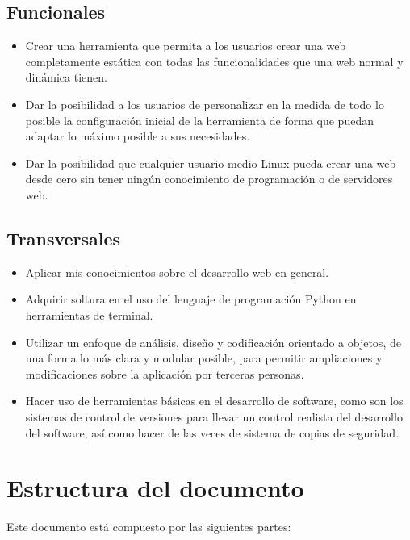 \subsection{Funcionales}
\begin{itemize}
\item Crear una herramienta que permita a los usuarios crear una web completamente estática
con todas las funcionalidades que una web normal y dinámica tienen.
\item Dar la posibilidad a los usuarios de personalizar en la medida de todo lo posible la configuración
inicial de la herramienta de forma que puedan adaptar lo máximo posible a sus necesidades.
\item Dar la posibilidad que cualquier usuario medio Linux pueda crear una web desde cero sin tener
ningún conocimiento de programación o de servidores web.
\end{itemize}

\subsection{Transversales}
\begin{itemize}
\item Aplicar mis conocimientos sobre el desarrollo web en general.
\item Adquirir soltura en el uso del lenguaje de programación Python en herramientas de terminal.
\item Utilizar un enfoque de análisis, diseño y codificación orientado a objetos,
de una forma lo más clara y modular posible, para permitir ampliaciones y
modificaciones sobre la aplicación por terceras personas.
\item Hacer uso de herramientas básicas en el desarrollo de software, como son los
sistemas de control de versiones para llevar un control realista del desarrollo
del software, así como hacer de las veces de sistema de copias de seguridad.
\end{itemize}

\section{Estructura del documento}

Este documento está compuesto por las siguientes partes:

